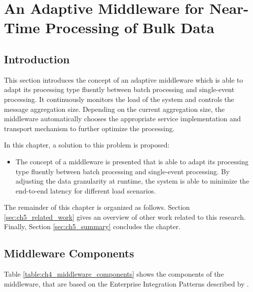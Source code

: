 \chapter{An Adaptive Middleware for Near-Time Processing of Bulk Data}\label{ch:adaptive_middleware}

\section{Introduction}\label{sec:introduction}
This section introduces the concept of an adaptive middleware which is able to adapt its processing type fluently between batch processing and single-event processing. It continuously monitors the load of the system and controls the message aggregation size. Depending on the current aggregation size, the middleware automatically chooses the appropriate service implementation and transport mechanism to further optimize the processing.

In this chapter, a solution to this problem is proposed:

\begin{itemize}
	\item The concept of a middleware is presented that is able to adapt its processing type fluently between batch processing and single-event processing. By adjusting the data granularity at runtime, the system is able to minimize the end-to-end latency for different load scenarios.
\end{itemize}

The remainder of this chapter is organized as follows. Section \ref{sec:ch5_related_work} gives an overview of other work related to this research. Finally, Section \ref{sec:ch5_summary} concludes the chapter.

\section{Middleware Components}
Table \ref{table:ch4_middleware_components} shows the components of the middleware, that are based on the Enterprise Integration Patterns described by \cite{Hohpe:2003fk}.

